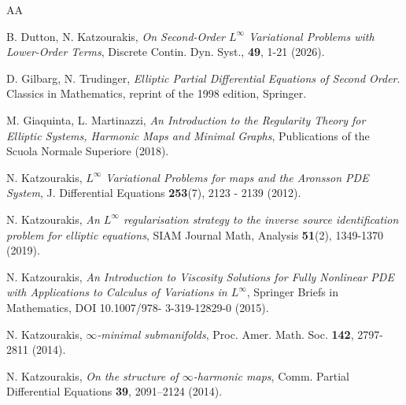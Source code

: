 \documentclass[a4paper,11pt]{article}
\numberwithin{equation}{section}
\theoremstyle{definition}
\begin{document}
\begin{thebibliography}{AA}


B. Dutton, N. Katzourakis, {\it On Second-Order $L^\infty$ Variational Problems with Lower-Order Terms}, Discrete Contin. Dyn. Syst., {\bf 49}, 1-21 (2026).

D. Gilbarg, N. Trudinger, {\it Elliptic Partial Differential Equations of Second Order}.
Classics in Mathematics, reprint of the 1998 edition, Springer.



M. Giaquinta, L. Martinazzi, {\it An Introduction to the Regularity Theory for Elliptic Systems,
Harmonic Maps and Minimal Graphs}, Publications of the Scuola Normale Superiore (2018).

N. Katzourakis, {\it $L^\infty$ Variational Problems for maps and the Aronsson PDE System}, J. Differential
Equations {\bf 253}(7), 2123 - 2139 (2012).

N. Katzourakis, {\it An $L^\infty$ regularisation strategy to the inverse source identification problem for elliptic equations}, SIAM Journal Math, Analysis {\bf 51}(2), 1349-1370 (2019).


N. Katzourakis, {\it An Introduction to Viscosity Solutions for Fully Nonlinear PDE with Applications
to Calculus of Variations in $L^\infty$}, Springer Briefs in Mathematics,  DOI 10.1007/978-
3-319-12829-0 (2015).

N. Katzourakis, {\it $\infty$-minimal submanifolds}, Proc. Amer. Math. Soc. {\bf 142}, 2797-2811 (2014).

N. Katzourakis, {\it On the structure of $\infty$-harmonic maps}, Comm. Partial Differential
Equations {\bf 39}, 2091–2124 (2014).



\end{thebibliography}
\end{document}
